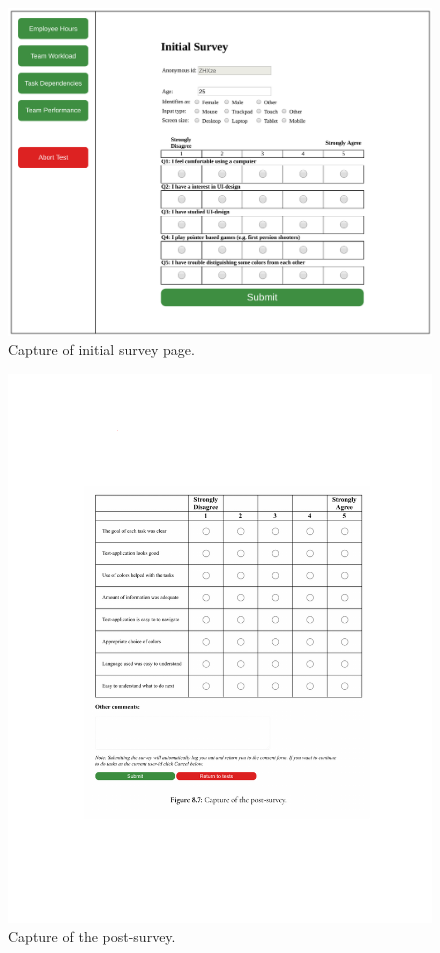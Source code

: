   \begin{figure}[h!]
    \centering
    \includegraphics[width=\textwidth]{figures/captures/webapp_pre_survey.pdf}
    \caption{Capture of initial survey page.}
    \label{label_preSurvey}
  \end{figure}

  \begin{figure}[h!]
    \centering
    \includegraphics[trim={2.0cm 4cm 2.0cm 5cm},clip,width=\textwidth]{figures/captures/webapp_post_survey.pdf}
    \caption{Capture of the post-survey.}
  \end{figure}
